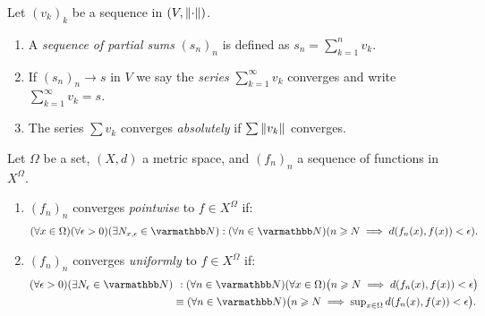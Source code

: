         \begin{definition}
            Let $(v_k)_k$ be a sequence in $(V,\left\lVert \cdot \right\rVert)$.
            \begin{enumerate}[label = (\arabic*),itemsep=1pt,topsep=3pt]
                \item A \textit{sequence of partial sums} $(s_n)_n$ is defined as $s_n = \sum_{k = 1}^n v_k$.
                \item If $(s_n)_n \rightarrow s$ in $V$ we say the \textit{series} $\sum_{k = 1}^\infty v_k$ converges and write $\sum_{k = 1}^\infty v_k = s$.
                \item The series $\sum v_k$ converges \textit{absolutely} if $\sum \left\lVert v_k \right\rVert$ converges.
            \end{enumerate}
        \end{definition}

    \begin{center}
    \end{center}

    \begin{definition}
        Let $\Omega$ be a set, $(X,d)$ a metric space, and $(f_n)_n$ a sequence of functions in $X^\Omega$.
        \begin{enumerate}[label = (\arabic*),itemsep=-7pt,topsep=3pt]
            \item $(f_n)_n$ converges \textit{pointwise} to $f \in X^\Omega$ if:
                \begin{equation*}
                \begin{split}
                    (\forall x \in \Omega)(\forall \epsilon > 0)(\exists N_{x,\epsilon} \in \bfN) : (\forall n \in \bfN)( n \geq N \implies d(f_n(x), f(x)) < \epsilon).
                \end{split}
                \end{equation*}
            \item $(f_n)_n$ converges \textit{uniformly} to $f \in X^\Omega$ if:
                \begin{equation*}
                \begin{split}
                        (\forall \epsilon > 0)(\exists N_\epsilon \in \bfN) &\h4: (\forall n \in \bfN)(\forall x \in \Omega)\bigl(n \geq N \implies d(f_n(x), f(x)) < \epsilon\bigr) \\
                        &\equiv (\forall n \in \bfN)\bigl(n \geq N \implies {\ts \sup_{x \in \Omega}d(f_n(x),f(x))} < \epsilon\bigr).
                \end{split}
                \end{equation*}
        \end{enumerate}
    \end{definition}

